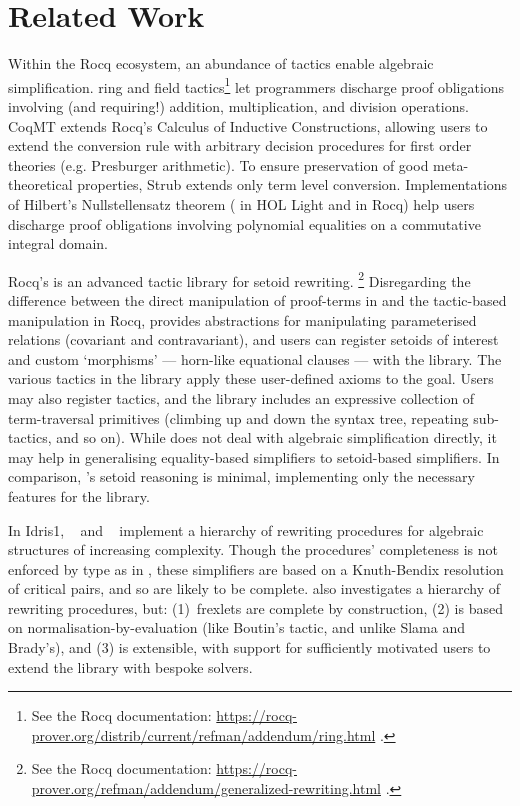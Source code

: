\section{Related Work}
Within the Rocq ecosystem, an abundance of tactics enable algebraic simplification.
%
 ring
and field tactics\footnote{See the Rocq documentation:
  \url{https://rocq-prover.org/distrib/current/refman/addendum/ring.html} .}
let programmers discharge proof obligations involving (and requiring!)
addition, multiplication, and division operations.
 CoqMT extends Rocq's Calculus of
Inductive Constructions, allowing users to extend the conversion rule with
arbitrary decision procedures for first order theories (e.g. Presburger
arithmetic).
%
To ensure preservation of good meta-theoretical
properties, Strub extends only term level conversion.
%
Implementations of Hilbert's Nullstellensatz theorem
( in HOL Light
and  in Rocq)
help users discharge proof obligations involving
polynomial equalities on a commutative integral domain.
%

Rocq's \SetoidRewrite{} is an advanced tactic library for setoid rewriting.%
\footnote{See the Rocq documentation:
  \url{https://rocq-prover.org/refman/addendum/generalized-rewriting.html}
  .} Disregarding the difference between the direct manipulation of
proof-terms in \idris{} and the tactic-based manipulation in Rocq,
\SetoidRewrite{} provides abstractions for manipulating parameterised
relations (covariant and contravariant), and users can register
setoids of interest and custom `morphisms' --- horn-like equational
clauses --- with the library. The various tactics in the library apply
these user-defined axioms to the goal. Users may also register
tactics, and the library includes an expressive collection of
term-traversal primitives (climbing up and down the syntax tree,
repeating sub-tactics, and so on). While \SetoidRewrite{} does not deal
with algebraic simplification directly, it may help in generalising
equality-based simplifiers to setoid-based simplifiers. In comparison,
\Frexlib{}'s setoid reasoning is minimal, implementing only the
necessary features for the library.

In Idris1,
\citeauthor{slama-brady:automatically-proving-equivalence-by-type-safe-reflection}~\citeyearpar{slama-brady:automatically-proving-equivalence-by-type-safe-reflection} and
\citeauthor{slama:thesis}~\citeyearpar{slama:thesis} implement a hierarchy of rewriting procedures for
algebraic structures of increasing complexity.  Though the procedures'
completeness is not enforced by type as in \Frexlib{}, these
simplifiers are based on a Knuth-Bendix resolution of critical pairs,
and so are likely to be complete.  \Frexlib{} also investigates a hierarchy of
rewriting procedures, but: (1)~frexlets are complete by
construction, (2) \Frexlib{} is based on normalisation-by-evaluation
(like Boutin's tactic, and unlike Slama and Brady's), and (3) \Frexlib{} is
extensible, with support for sufficiently motivated users to extend the library
with bespoke solvers.

